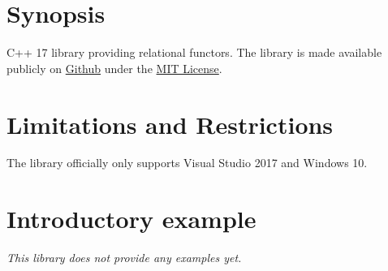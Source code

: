 \documentclass[oneside]{book}
\begin{document}
\frontmatter

\begin{titlepage}
\maketitle
\end{titlepage}

\tableofcontents
{}

\mainmatter

\chapter{Synopsis}
C++ 17 library providing relational functors.
The library is made available publicly on
\href{\GetLibraryRepository}{Github}
under the
\href{\GetLibraryRepository/blob/master/LICENSE}{MIT License}.

\chapter{Limitations and Restrictions}
The library officially only supports Visual Studio 2017 and Windows 10.

\chapter{Introductory example}
\textit{\color{orange}This library does not provide any examples yet.}
\end{document}

